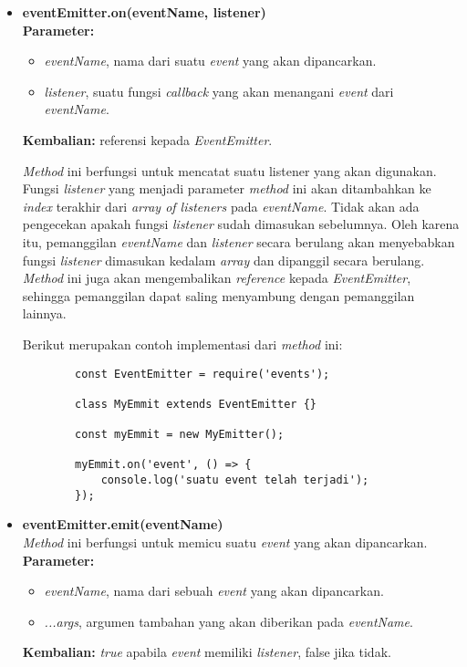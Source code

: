 \begin{itemize}
	\item \textbf{eventEmitter.on(eventName, listener)} \\ \textbf{Parameter:}
	\begin{itemize}
		\item \textit{eventName}, nama dari suatu \textit{event} yang akan dipancarkan.
		\item \textit{listener}, suatu fungsi \textit{callback} yang akan menangani \textit{event} dari \textit{eventName}. 
	\end{itemize} 
	\textbf{Kembalian:} referensi kepada \textit{EventEmitter}.

	\textit{Method} ini berfungsi untuk mencatat suatu listener yang akan digunakan. Fungsi \textit{listener} yang menjadi parameter \textit{method} ini akan ditambahkan ke \textit{index} terakhir dari \textit{array of listeners} pada \textit{eventName}. Tidak akan ada pengecekan apakah fungsi \textit{listener} sudah dimasukan sebelumnya. Oleh karena itu, pemanggilan \textit{eventName} dan \textit{listener} secara berulang akan menyebabkan fungsi \textit{listener} dimasukan kedalam \textit{array} dan dipanggil secara berulang. \textit{Method} ini juga akan mengembalikan \textit{reference} kepada \textit{EventEmitter}, sehingga pemanggilan dapat saling menyambung dengan pemanggilan lainnya.
	
	Berikut merupakan contoh implementasi dari \textit{method} ini:
	\begin{lstlisting}
		const EventEmitter = require('events');
		
		class MyEmmit extends EventEmitter {}
		
		const myEmmit = new MyEmitter();
		
		myEmmit.on('event', () => {
			console.log('suatu event telah terjadi');	
		});
	\end{lstlisting}
	
	\item \textbf{eventEmitter.emit(eventName)} \\ \textit{Method} ini berfungsi untuk memicu suatu \textit{event} yang akan dipancarkan. \textbf{Parameter:}
	\begin{itemize}
		\item \textit{eventName}, nama dari sebuah \textit{event} yang akan dipancarkan.
		\item \textit{...args}, argumen tambahan yang akan diberikan pada \textit{eventName}. 
	\end{itemize}
	\textbf{Kembalian:} \textit{true} apabila \textit{event} memiliki \textit{listener}, false jika tidak.


\end{itemize}
